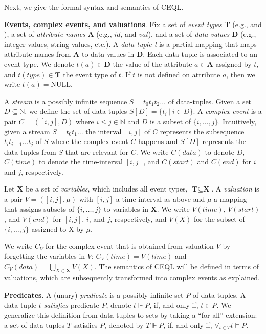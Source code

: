 Next, we give the formal syntax and semantics of CEQL.

\textbf{Events, complex events, and valuations}. Fix a set of \emph{event types} \textbf{T} (e.g.,  and ), a set of \emph{attribute names} \textbf{A} (e.g., $id$, and $val$), and a set of \emph{data values} \textbf{D} (e.g., integer values, string values, etc.). A \emph{data-tuple t} is a partial mapping that maps attribute names from \textbf{A} to data values in \textbf{D}. Each data-tuple is associated to an event type. We denote $t(a) \in \textbf{D}$ the value of the attribute $a \in \textbf{A}$ assigned by $t$, and $t(type) \in \textbf{T}$ the event type of $t$. If $t$ is not defined on attribute $a$, then we write $t(a) = \text{NULL}$.

A \emph{stream} is a possibly infinite sequence $S = t_{0}t_{1}t_{2}\ldots$ of data-tuples. Given a set $D \subseteq \mathbb{N}$, we define the set of data tuples $S[D] = \{ t_{i} \ | \ i \in D\}$. A \emph{complex event} is a pair $C = ([i,j], D)$ where $i \le j \in \mathbb{N}$ and $D$ is a subset of $\{i, \ldots, j\}$. Intuitively, given a stream $S = t_{0}t_{1}\ldots$ the interval $[i, j]$ of $C$ represents the subsequence $t_{i}t_{i+1} \ldots t_{j}$ of $S$ where the complex event $C$ happens and $S[D]$ represents the data-tuples from $S$ that are relevant for $C$. We write $C(data)$ to denote $D$, $C(time)$ to denote the time-interval $[i, j]$, and $C(start)$ and $C(end)$ for $i$ and $j$, respectively.

Let \textbf{X} be a set of \emph{variables}, which includes all event types, $\textbf{T} \subseteq \textbf{X}$. A \emph{valuation} is a pair $V = ([i, j], \mu)$ with $[i,j]$ a time interval as above and $\mu$ a mapping that assigns subsets of $\{i, \ldots, j\}$ to variables in \textbf{X}. We write $V(time)$, $V(start)$, and $V(end)$ for $[i,j]$, $i$, and $j$, respectively, and $V(X)$ for the subset of $\{i,\ldots, j\}$ assigned to X by $\mu$.

We write $C_{V}$ for the complex event that is obtained from valuation $V$ by forgetting the variables in $V$: $C_{V}(time) = V(time)$ and $C_{V}(data) = \bigcup\limits_{X \in \textbf{X}} V(X)$. The semantics of CEQL will be defined in terms of valuations, which are subsequently transformed into complex events as explained.

\textbf{Predicates}. A (unary) \emph{predicate} is a possibly infinite set $P$ of data-tuples. A data-tuple $t$ \emph{satisfies} predicate $P$, denote $t \Vdash P$, if, and only if, $t \in P$. We generalize this definition from data-tuples to sets by taking a ``for all'' extension: a set of data-tuples $T$ satisfies $P$, denoted by $T \Vdash P$, if, and only if, $\displaystyle\mathop{\forall}_{t \in T} t \vDash P$.

